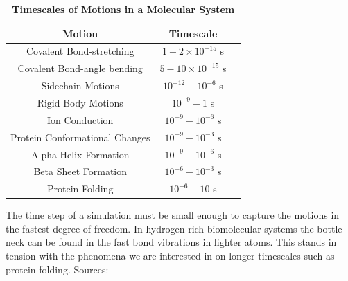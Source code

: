 \begin{table}
	\begin{center}   
		\begin{tabular}{ |c|c|c|}
			\hline
			Motion & Timescale \\
			\hline
			Covalent Bond-stretching & $1-2\times10^{-15}$ s \\
			Covalent Bond-angle bending & $5-10\times10^{-15}$ s \\ 
			Sidechain  Motions & $10 ^{-12}-10^{-6}$ s \\
			Rigid Body Motions & $10 ^{-9}-1$ s \\
			Ion Conduction & $10^{-9}-10^{-6}$ s \\
			Protein Conformational Changes & $10^{-9}-10^{-3}$ s \\
			Alpha Helix Formation & $10^{-9}-10^{-6}$ s \\
			Beta Sheet Formation & $10^{-6}-10^{-3}$ s \\
			Protein Folding & $10^{-6}-10$ s \\
			\hline
		\end{tabular}
\end{center}
	\captionsetup{singlelinecheck = false, justification=raggedright}
\caption[Timescales of Motions in a Molecular System]{\textbf{Timescales of Motions in a Molecular System}} {The time step of a simulation must be small enough to capture the motions in the fastest degree of freedom. In hydrogen-rich biomolecular systems the bottle neck can be found in the fast bond vibrations in lighter atoms. This stands in tension with the phenomena we are interested in on longer timescales such as protein folding. Sources: \cite{leach2001, schlick2010, brooks1988, flood2019, werner2012, feenstra1999}}
	\label{timescales}
\end{table}


